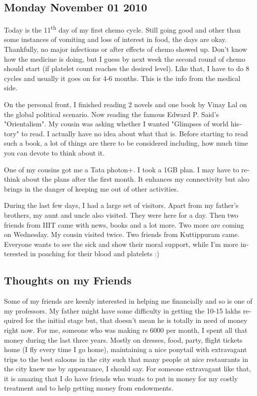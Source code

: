 \begin{english}
\vskip 2pt
\subsection*{Monday November 01 2010}

Today is the 11\textsuperscript{th} day of my first chemo cycle. Still going good and other
than some instances of vomiting and loss of interest in food, the days are okay.
Thankfully, no major infections or after effects of chemo showed up. 
Don't know how the medicine is doing, but I guess by next week the second 
round of chemo should start (if platelet count reaches the desired level). 
Like that, I have to do 8 cycles and usually it goes on for 4-6 months. 
This is the info from the medical side.

On the personal front, I finished reading 2 novels and one book by Vinay 
Lal on the global political scenario. Now reading the famous Edward P. Said's 
"Orientalism". My cousin was asking whether I wanted "Glimpses of world history" 
to read. I actually have no idea about what that is. Before starting to read such a book, 
a lot of things are there to be considered including, how much time you can devote to 
think about it. 

One of my cousins got me a Tata photon+. I took a 1GB plan. I may have to rethink 
about the plans after the first month. It enhances my connectivity but also brings 
in the danger of keeping me out of other activities.

During the last few days, I had a large set of visitors. Apart from my father's brothers,
my aunt and uncle also visited. They were here for a day. Then two friends from IIIT 
came with news, books and a lot more. Two more are coming on Wednesday. My cousin visited 
twice. Two friends from Kuttippuram came. Everyone wants to see the sick and 
show their moral support, while I'm more interested in poaching for their blood and 
platelets :) 

\subsection*{Thoughts on my Friends}

Some of my friends are keenly interested in helping me financially and so is one of my professors. 
My father might have some difficulty in getting the 10-15 lakhs required for the initial stage 
but, that doesn't mean he is totally in need of money right now. For me, someone who was making 
rs 6000 per month, I spent all that money during the last three years. Mostly on dresses, food, party, 
flight tickets home (I fly every time I go home), maintaining a nice ponytail with extravagant trips to the best 
saloons in the city such that many people at nice restaurants in the city knew me by appearance, I should say. 
For someone extravagant like that, it is amazing that I do have friends who wants to put in money 
for my costly treatment and to help getting money from endowments. 


\end{english}

